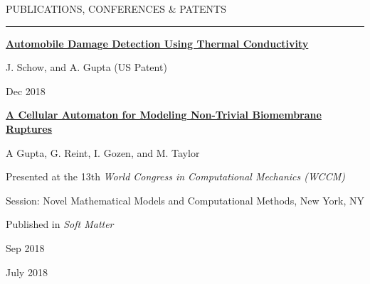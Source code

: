 

{
\hspace{-1.72in}\noindent\color{cblue}
{PUBLICATIONS, CONFERENCES \& PATENTS} %
}

\vspace{-1.6ex}
{\hspace{-1.73in}\noindent\color{dblue}\rule{6.935in}{0.4pt}} %
\vspace{-2.4ex}

{\hspace{-1.76in}\fontsize{9}{1}
\textbf{\href{https://patents.google.com/patent/US20200202637A1/en}{Automobile Damage Detection Using Thermal Conductivity}    }}

{\hspace{-1.76in}\fontsize{9}{1}
{\small J. Schow, and A. Gupta (US Patent)}
}

\begin{subtitle}
    \vspace{-8.2ex}
    {{Dec 2018}}
\end{subtitle}

\vspace{2ex}

{\hspace{-1.76in}\fontsize{9}{1}
\textbf{\href{https://pubmed.ncbi.nlm.nih.gov/31062781/}{A Cellular Automaton for Modeling Non-Trivial Biomembrane Ruptures}
}}

{\hspace{-1.76in}\fontsize{9}{1} 
{\small A Gupta, G. Reint, I. Gozen, and M. Taylor}}

{\hspace{-1.76in}\fontsize{9}{1}
\small Presented at the 13th \textit{World Congress in Computational Mechanics (WCCM)}
}

{\hspace{-1.76in}\fontsize{9}{1}
\small Session: Novel Mathematical Models and Computational Methods, New York, NY
}

{\hspace{-1.76in}\fontsize{9}{1}
\small Published in \textit{Soft Matter}
}

\begin{subtitle}
    \vspace{-7.2ex}
    {{Sep 2018}}
\end{subtitle}

\begin{subtitle}
    \vspace{-10.2ex}
    {{July 2018}}
\end{subtitle}

\vspace{3ex}